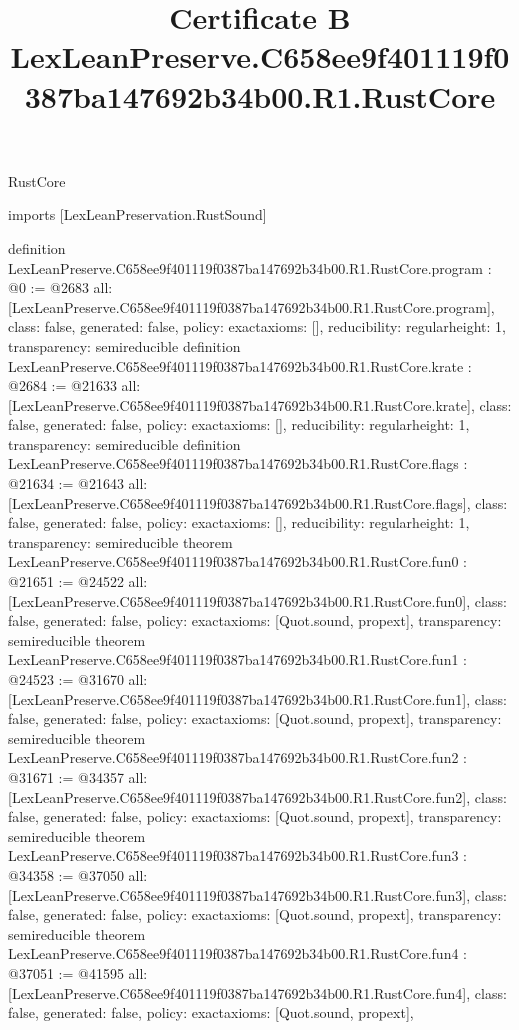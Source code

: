 \begin{lexlean}{RustCore}
\title{Certificate B LexLeanPreserve.C658ee9f401119f0387ba147692b34b00.R1.RustCore}
\begin{coremodule}
imports [LexLeanPreservation.RustSound]

definition LexLeanPreserve.C658ee9f401119f0387ba147692b34b00.R1.RustCore.program : @0 := @2683 {
  all: [LexLeanPreserve.C658ee9f401119f0387ba147692b34b00.R1.RustCore.program],
  class: false,
  generated: false,
  policy: exact{axioms: []},
  reducibility: regular{height: 1},
  transparency: semireducible
}
definition LexLeanPreserve.C658ee9f401119f0387ba147692b34b00.R1.RustCore.krate : @2684 := @21633 {
  all: [LexLeanPreserve.C658ee9f401119f0387ba147692b34b00.R1.RustCore.krate],
  class: false,
  generated: false,
  policy: exact{axioms: []},
  reducibility: regular{height: 1},
  transparency: semireducible
}
definition LexLeanPreserve.C658ee9f401119f0387ba147692b34b00.R1.RustCore.flags : @21634 := @21643 {
  all: [LexLeanPreserve.C658ee9f401119f0387ba147692b34b00.R1.RustCore.flags],
  class: false,
  generated: false,
  policy: exact{axioms: []},
  reducibility: regular{height: 1},
  transparency: semireducible
}
theorem LexLeanPreserve.C658ee9f401119f0387ba147692b34b00.R1.RustCore.fun0 : @21651 := @24522 {
  all: [LexLeanPreserve.C658ee9f401119f0387ba147692b34b00.R1.RustCore.fun0],
  class: false,
  generated: false,
  policy: exact{axioms: [Quot.sound, propext]},
  transparency: semireducible
}
theorem LexLeanPreserve.C658ee9f401119f0387ba147692b34b00.R1.RustCore.fun1 : @24523 := @31670 {
  all: [LexLeanPreserve.C658ee9f401119f0387ba147692b34b00.R1.RustCore.fun1],
  class: false,
  generated: false,
  policy: exact{axioms: [Quot.sound, propext]},
  transparency: semireducible
}
theorem LexLeanPreserve.C658ee9f401119f0387ba147692b34b00.R1.RustCore.fun2 : @31671 := @34357 {
  all: [LexLeanPreserve.C658ee9f401119f0387ba147692b34b00.R1.RustCore.fun2],
  class: false,
  generated: false,
  policy: exact{axioms: [Quot.sound, propext]},
  transparency: semireducible
}
theorem LexLeanPreserve.C658ee9f401119f0387ba147692b34b00.R1.RustCore.fun3 : @34358 := @37050 {
  all: [LexLeanPreserve.C658ee9f401119f0387ba147692b34b00.R1.RustCore.fun3],
  class: false,
  generated: false,
  policy: exact{axioms: [Quot.sound, propext]},
  transparency: semireducible
}
theorem LexLeanPreserve.C658ee9f401119f0387ba147692b34b00.R1.RustCore.fun4 : @37051 := @41595 {
  all: [LexLeanPreserve.C658ee9f401119f0387ba147692b34b00.R1.RustCore.fun4],
  class: false,
  generated: false,
  policy: exact{axioms: [Quot.sound, propext]},
}
\end{coremodule}
\end{lexlean}
